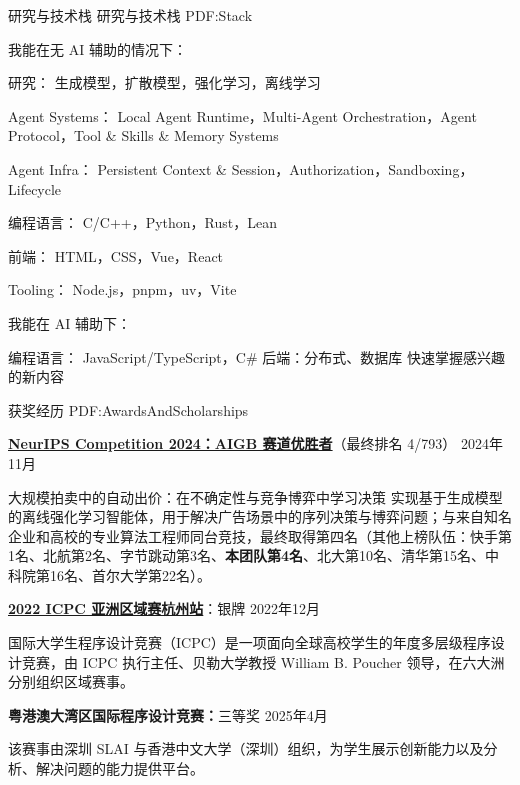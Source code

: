 \documentclass[letterpaper,MMMyyyy,nonstopmode]{simpleresumecv}
\renewcommand{\Gap}{\par\vspace{0.75mm}\par}
\renewcommand{\BigGap}{\par\vspace{2.8mm}\par}
\renewcommand{\DatestampYMD}[3]{\mbox{#1年#2月}}
\renewcommand{\DatestampYM}[2]{\mbox{#1年#2月}}
\begin{document}
\begin{Body}

\Section
{研究与技术栈}
{研究与技术栈}
{PDF:Stack}

我能在无 AI 辅助的情况下：

\BulletItem
研究： 生成模型，扩散模型，强化学习，离线学习

\BulletItem
Agent Systems： Local Agent Runtime，Multi-Agent Orchestration，Agent Protocol，Tool \& Skills \& Memory Systems

\BulletItem
Agent Infra： Persistent Context \& Session，Authorization，Sandboxing，Lifecycle

\BulletItem
编程语言： C/C++，Python，Rust，Lean

\BulletItem
前端： HTML，CSS，Vue，React

\BulletItem
Tooling： Node.js，pnpm，uv，Vite

\BigGap
我能在 AI 辅助下：

\BulletItem
编程语言： JavaScript/TypeScript，C\#
\BulletItem
后端：分布式、数据库
\BulletItem
快速掌握感兴趣的新内容

\BigGap


{获奖经历}
{PDF:AwardsAndScholarships}

\BulletItem
\href{https://neurips.cc/virtual/2024/competition/84793}{\textbf{NeurIPS Competition 2024：AIGB 赛道优胜者}}（最终排名 4/793）
\hfill
\DatestampYM{2024}{11}
\begin{Detail}
\Item
大规模拍卖中的自动出价：在不确定性与竞争博弈中学习决策
\Item
实现基于生成模型的离线强化学习智能体，用于解决广告场景中的序列决策与博弈问题；与来自知名企业和高校的专业算法工程师同台竞技，最终取得第四名（其他上榜队伍：快手第1名、北航第2名、字节跳动第3名、\textbf{本团队第4名}、北大第10名、清华第15名、中科院第16名、首尔大学第22名）。
\end{Detail}

\Gap
\BulletItem
\href{https://icpc.global/regionals/finder/ICPC-Hangzhou-2023}{\textbf{2022 ICPC 亚洲区域赛杭州站}}：银牌
\hfill
\DatestampYMD{2022}{12}{04}
\begin{Detail}
\Item
国际大学生程序设计竞赛（ICPC）是一项面向全球高校学生的年度多层级程序设计竞赛，由 ICPC 执行主任、贝勒大学教授 William B. Poucher 领导，在六大洲分别组织区域赛事。
\end{Detail}

\Gap
\BulletItem
\textbf{粤港澳大湾区国际程序设计竞赛：}三等奖
\hfill
\DatestampYMD{2025}{4}{19}
\begin{Detail}
\Item
该赛事由深圳 SLAI 与香港中文大学（深圳）组织，为学生展示创新能力以及分析、解决问题的能力提供平台。
\end{Detail}


\end{Body}
\end{document}
